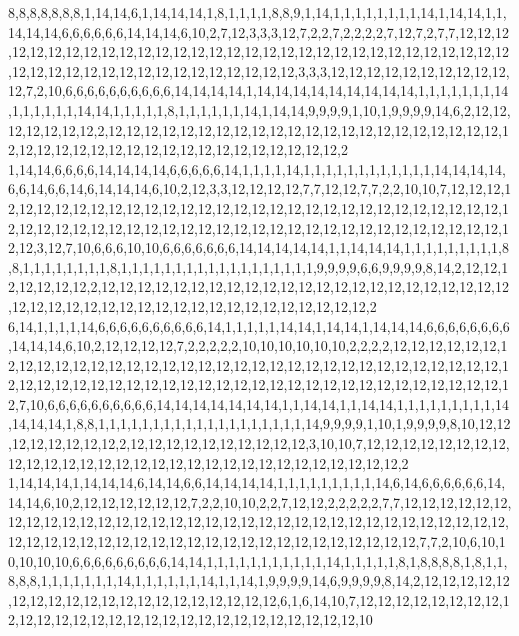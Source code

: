 8,8,8,8,8,8,8,1,14,14,6,1,14,14,14,1,8,1,1,1,1,8,8,9,1,14,1,1,1,1,1,1,1,1,14,1,14,14,1,1,14,14,14,6,6,6,6,6,6,14,14,14,6,10,2,7,12,3,3,3,12,7,2,2,7,2,2,2,2,7,12,7,2,7,7,12,12,12,12,12,12,12,12,12,12,12,12,12,12,12,12,12,12,12,12,12,12,12,12,12,12,12,12,12,12,12,12,12,12,12,12,12,12,12,12,12,12,12,12,12,12,12,3,3,3,12,12,12,12,12,12,12,12,12,12,12,7,2,10,6,6,6,6,6,6,6,6,6,6,14,14,14,14,1,14,14,14,14,14,14,14,14,14,1,1,1,1,1,1,1,14,1,1,1,1,1,1,14,14,1,1,1,1,1,8,1,1,1,1,1,1,14,1,14,14,9,9,9,9,1,10,1,9,9,9,9,14,6,2,12,12,12,12,12,12,12,2,12,12,12,12,12,12,12,12,12,12,12,12,12,12,12,12,12,12,12,12,12,12,12,12,12,12,12,12,12,12,12,12,12,12,12,12,12,12,12,12,12,2
1,14,14,6,6,6,6,14,14,14,14,6,6,6,6,6,14,1,1,1,1,14,1,1,1,1,1,1,1,1,1,1,1,1,14,14,14,14,6,6,14,6,6,14,6,14,14,14,6,10,2,12,3,3,12,12,12,12,7,7,12,12,7,7,2,2,10,10,7,12,12,12,12,12,12,12,12,12,12,12,12,12,12,12,12,12,12,12,12,12,12,12,12,12,12,12,12,12,12,12,12,12,12,12,12,12,12,12,12,12,12,12,12,12,12,12,12,12,12,12,12,12,12,12,12,12,12,12,12,12,3,12,7,10,6,6,6,10,10,6,6,6,6,6,6,6,14,14,14,14,14,1,1,14,14,14,1,1,1,1,1,1,1,1,1,8,8,1,1,1,1,1,1,1,1,8,1,1,1,1,1,1,1,1,1,1,1,1,1,1,1,1,1,1,9,9,9,9,6,6,9,9,9,9,8,14,2,12,12,12,12,12,12,12,2,12,12,12,12,12,12,12,12,12,12,12,12,12,12,12,12,12,12,12,12,12,12,12,12,12,12,12,12,12,12,12,12,12,12,12,12,12,12,12,12,12,12,12,2
6,14,1,1,1,1,14,6,6,6,6,6,6,6,6,6,6,14,1,1,1,1,1,14,14,1,14,14,1,14,14,14,6,6,6,6,6,6,6,6,14,14,14,6,10,2,12,12,12,12,7,2,2,2,2,2,10,10,10,10,10,10,2,2,2,2,12,12,12,12,12,12,12,12,12,12,12,12,12,12,12,12,12,12,12,12,12,12,12,12,12,12,12,12,12,12,12,12,12,12,12,12,12,12,12,12,12,12,12,12,12,12,12,12,12,12,12,12,12,12,12,12,12,12,12,12,12,12,12,7,10,6,6,6,6,6,6,6,6,6,6,14,14,14,14,14,14,14,1,1,14,14,1,1,14,14,1,1,1,1,1,1,1,1,1,14,14,14,14,1,8,8,1,1,1,1,1,1,1,1,1,1,1,1,1,1,1,1,1,1,1,14,9,9,9,9,1,10,1,9,9,9,9,8,10,12,12,12,12,12,12,12,12,2,12,12,12,12,12,12,12,12,12,12,3,10,10,7,12,12,12,12,12,12,12,12,12,12,12,12,12,12,12,12,12,12,12,12,12,12,12,12,12,12,12,12,12,12,2
1,14,14,14,1,14,14,14,6,14,14,6,6,14,14,14,14,1,1,1,1,1,1,1,1,1,14,6,14,6,6,6,6,6,6,14,14,14,6,10,2,12,12,12,12,12,12,7,2,2,10,10,2,2,7,12,12,2,2,2,2,2,7,7,12,12,12,12,12,12,12,12,12,12,12,12,12,12,12,12,12,12,12,12,12,12,12,12,12,12,12,12,12,12,12,12,12,12,12,12,12,12,12,12,12,12,12,12,12,12,12,12,12,12,12,12,12,12,12,12,12,7,7,2,10,6,10,10,10,10,10,6,6,6,6,6,6,6,6,6,14,14,1,1,1,1,1,1,1,1,1,1,1,14,1,1,1,1,1,8,1,8,8,8,8,1,8,1,1,8,8,8,1,1,1,1,1,1,1,14,1,1,1,1,1,1,14,1,1,14,1,9,9,9,9,14,6,9,9,9,9,8,14,2,12,12,12,12,12,12,12,12,12,12,12,12,12,12,12,12,12,12,12,12,6,1,6,14,10,7,12,12,12,12,12,12,12,12,12,12,12,12,12,12,12,12,12,12,12,12,12,12,12,12,12,12,12,12,10
